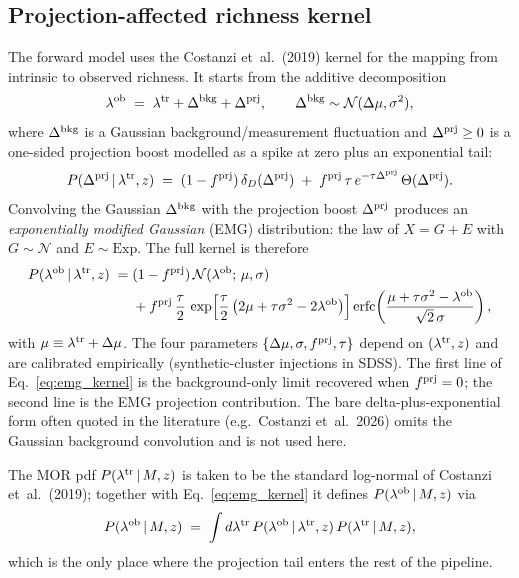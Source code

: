 \documentclass[a4paper, 11pt]{article}
\newcommand{\lob}{\lambda^{\rm ob}}
\newcommand{\ltr}{\lambda^{\rm tr}}
\newcommand{\dprj}{\Delta^{\rm prj}}
\begin{document}
\subsection{Projection-affected richness kernel}
\label{sec:richness}

The forward model uses the Costanzi et~al.\ (2019) kernel for the
mapping from intrinsic to observed richness.  It starts from the
additive decomposition
\begin{equation}
\lob \;=\; \ltr + \Delta^{\rm bkg} + \dprj ,
\qquad
\Delta^{\rm bkg}\sim \mathcal{N}(\Delta\mu,\sigma^{2}) ,
\label{eq:lob_decomp}
\end{equation}
where $\Delta^{\rm bkg}$ is a Gaussian background/measurement
fluctuation and $\dprj\ge 0$ is a one-sided projection boost modelled
as a spike at zero plus an exponential tail:
\begin{equation}
P(\dprj\,|\,\ltr,z) \;=\;
(1-f^{\rm prj})\,\delta_D(\dprj)
\;+\;
f^{\rm prj}\,\tau\,e^{-\tau\dprj}\,\Theta(\dprj) .
\label{eq:prj_spike_tail}
\end{equation}
Convolving the Gaussian $\Delta^{\rm bkg}$ with the projection boost
$\dprj$ produces an \emph{exponentially modified Gaussian} (EMG)
distribution: the law of $X=G+E$ with $G\sim\mathcal{N}$ and
$E\sim\mathrm{Exp}$.  The full kernel is therefore
\begin{equation}
\begin{aligned}
P(\lob\,|\,\ltr,z) \;=\;&
(1-f^{\rm prj})\,\mathcal{N}(\lob;\,\mu,\sigma) \\
&{}+ f^{\rm prj}\,\frac{\tau}{2}\,
\exp\!\left[\frac{\tau}{2}\left(2\mu+\tau\sigma^{2}-2\lob\right)\right]
\operatorname{erfc}\!\left(\frac{\mu+\tau\sigma^{2}-\lob}{\sqrt{2}\,\sigma}\right) ,
\end{aligned}
\label{eq:emg_kernel}
\end{equation}
with $\mu\equiv\ltr+\Delta\mu$.  The four parameters
$\{\Delta\mu,\sigma,f^{\rm prj},\tau\}$ depend on $(\ltr,z)$ and are
calibrated empirically (synthetic-cluster injections in SDSS).  The
first line of Eq.~\eqref{eq:emg_kernel} is the background-only limit
recovered when $f^{\rm prj}=0$; the second line is the EMG projection
contribution.  The bare delta-plus-exponential form often quoted in the
literature (e.g.\ Costanzi et~al.\ 2026) omits the Gaussian background
convolution and is not used here.

The MOR pdf $P(\ltr\,|\,M,z)$ is taken to be the standard log-normal
of Costanzi et~al.\ (2019); together with Eq.~\eqref{eq:emg_kernel} it
defines $P(\lob\,|\,M,z)$ via
\begin{equation}
P(\lob\,|\,M,z) \;=\;
\int d\ltr \, P(\lob\,|\,\ltr,z)\,P(\ltr\,|\,M,z) ,
\label{eq:Plob_M}
\end{equation}
which is the only place where the projection tail enters the rest of
the pipeline.
\end{document}
